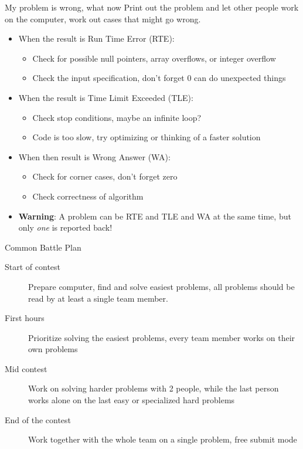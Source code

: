 \documentclass[11pt,pdf, aspectratio=169]{beamer}
\begin{document}
  \begin{frame}{My problem is wrong, what now}
    Print out the problem and let other people work on the computer, work out cases that might go wrong.
    \begin{itemize}
      \item When the result is Run Time Error (RTE):
      \begin{itemize}
        \item Check for possible null pointers, array overflows, or integer overflow
        \item Check the input specification, don't forget 0 can do unexpected things
      \end{itemize}
      \item When the result is Time Limit Exceeded (TLE):
      \begin{itemize}
        \item Check stop conditions, maybe an infinite loop?
        \item Code is too slow, try optimizing or thinking of a faster solution
      \end{itemize}
      \item When then result is Wrong Answer (WA):
      \begin{itemize}
        \item Check for corner cases, don't forget zero
        \item Check correctness of algorithm
      \end{itemize}
      \item \textbf{Warning}: A problem can be RTE and TLE and WA at the same time, but only \emph{one} is reported back!
    \end{itemize}
  \end{frame}
  \begin{frame}{Common Battle Plan}
    \begin{description}
      \item[Start of contest] Prepare computer, find and solve easiest problems, all problems should be read by at least a single team member.
      \item[First hours] Prioritize solving the easiest problems, every team member works on their own problems
      \item[Mid contest] Work on solving harder problems with 2 people, while the last person works alone on the last easy or specialized hard problems
      \item[End of the contest] Work together with the whole team on a single problem, free submit mode
    \end{description}
  \end{frame}
\end{document}
